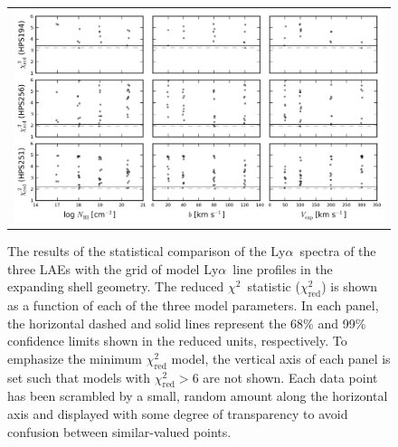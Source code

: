 \documentclass{emulateapj}
\newcommand{\lya}{Ly$\alpha$}
\def\chisq{$\chi^{2}$}
\begin{document}
	\begin{figure}[t]
	\begin{center}
	\begin{tabular}{c}
	\includegraphics[width=17cm]{f6.png}
	\end{tabular}
	\end{center}
	\caption[example] 
	{ \label{fig:Chi2Comparison} 
	The results of the statistical comparison of the \lya\ spectra of the three LAEs with the grid of model \lya\ line profiles in the expanding shell geometry. The reduced \chisq\ statistic ($\chi_{\mathrm{red}}^{2}$) is shown as a function of each of the three model parameters. In each panel, the horizontal dashed and solid lines represent the 68\% and 99\% confidence limits shown in the reduced units, respectively. To emphasize the minimum $\chi_{\mathrm{red}}^{2}$ model, the vertical axis of each panel is set such that models with $\chi_{\mathrm{red}}^{2} > 6$ are not shown. Each data point has been scrambled by a small, random amount along the horizontal axis and displayed with some degree of transparency to avoid confusion between similar-valued points.}
	\end{figure} 
\end{document}
